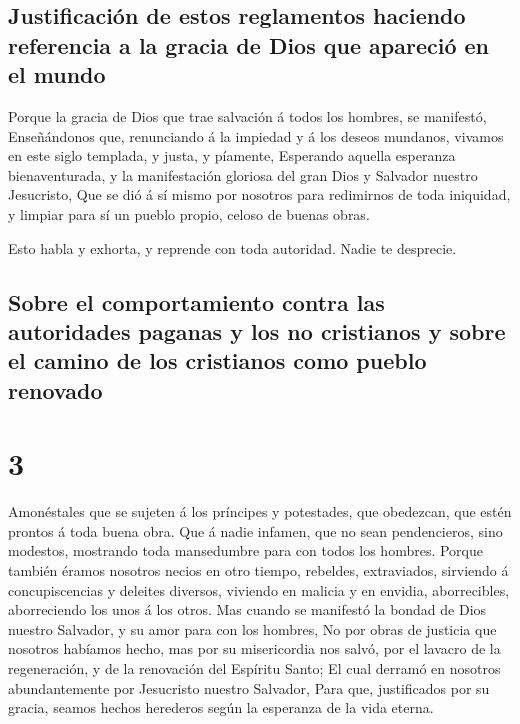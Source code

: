 \hypertarget{justificaciuxf3n-de-estos-reglamentos-haciendo-referencia-a-la-gracia-de-dios-que-apareciuxf3-en-el-mundo}{%
\subsection{Justificación de estos reglamentos haciendo referencia a la
gracia de Dios que apareció en el
mundo}\label{justificaciuxf3n-de-estos-reglamentos-haciendo-referencia-a-la-gracia-de-dios-que-apareciuxf3-en-el-mundo}}

 Porque la gracia de Dios que trae salvación á todos los
hombres, se manifestó,  Enseñándonos que, renunciando á
la impiedad y á los deseos mundanos, vivamos en este siglo templada, y
justa, y píamente,  Esperando aquella esperanza
bienaventurada, y la manifestación gloriosa del gran Dios y Salvador
nuestro Jesucristo,  Que se dió á sí mismo por nosotros
para redimirnos de toda iniquidad, y limpiar para sí un pueblo propio,
celoso de buenas obras.

 Esto habla y exhorta, y reprende con toda autoridad.
Nadie te desprecie.

\hypertarget{sobre-el-comportamiento-contra-las-autoridades-paganas-y-los-no-cristianos-y-sobre-el-camino-de-los-cristianos-como-pueblo-renovado}{%
\subsection{Sobre el comportamiento contra las autoridades paganas y los
no cristianos y sobre el camino de los cristianos como pueblo
renovado}\label{sobre-el-comportamiento-contra-las-autoridades-paganas-y-los-no-cristianos-y-sobre-el-camino-de-los-cristianos-como-pueblo-renovado}}

\hypertarget{section-2}{%
\section{3}\label{section-2}}

 Amonéstales que se sujeten á los príncipes y potestades,
que obedezcan, que estén prontos á toda buena obra.  Que á
nadie infamen, que no sean pendencieros, sino modestos, mostrando toda
mansedumbre para con todos los hombres.  Porque también
éramos nosotros necios en otro tiempo, rebeldes, extraviados, sirviendo
á concupiscencias y deleites diversos, viviendo en malicia y en envidia,
aborrecibles, aborreciendo los unos á los otros.  Mas
cuando se manifestó la bondad de Dios nuestro Salvador, y su amor para
con los hombres,  No por obras de justicia que nosotros
habíamos hecho, mas por su misericordia nos salvó, por el lavacro de la
regeneración, y de la renovación del Espíritu Santo;  El
cual derramó en nosotros abundantemente por Jesucristo nuestro Salvador,
 Para que, justificados por su gracia, seamos hechos
herederos según la esperanza de la vida eterna.

